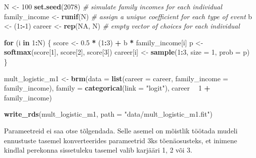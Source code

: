 \documentclass[]{book}
\newenvironment{Shaded}{\begin{snugshade}}{\end{snugshade}}
\newcommand{\KeywordTok}[1]{\textcolor[rgb]{0.13,0.29,0.53}{\textbf{#1}}}
\newcommand{\DataTypeTok}[1]{\textcolor[rgb]{0.13,0.29,0.53}{#1}}
\newcommand{\DecValTok}[1]{\textcolor[rgb]{0.00,0.00,0.81}{#1}}
\newcommand{\FloatTok}[1]{\textcolor[rgb]{0.00,0.00,0.81}{#1}}
\newcommand{\StringTok}[1]{\textcolor[rgb]{0.31,0.60,0.02}{#1}}
\newcommand{\CommentTok}[1]{\textcolor[rgb]{0.56,0.35,0.01}{\textit{#1}}}
\newcommand{\OtherTok}[1]{\textcolor[rgb]{0.56,0.35,0.01}{#1}}
\newcommand{\ControlFlowTok}[1]{\textcolor[rgb]{0.13,0.29,0.53}{\textbf{#1}}}
\newcommand{\OperatorTok}[1]{\textcolor[rgb]{0.81,0.36,0.00}{\textbf{#1}}}
\newcommand{\NormalTok}[1]{#1}
\begin{document}
\begin{Shaded}
\begin{Highlighting}[]
\NormalTok{N <-}\StringTok{ }\DecValTok{100}
\KeywordTok{set.seed}\NormalTok{(}\DecValTok{2078}\NormalTok{)}
\CommentTok{# simulate family incomes for each individual}
\NormalTok{family_income <-}\StringTok{ }\KeywordTok{runif}\NormalTok{(N)}
\CommentTok{# assign a unique coefficient for each type of event}
\NormalTok{b      <-}\StringTok{ }\NormalTok{(}\DecValTok{1}\OperatorTok{:-}\DecValTok{1}\NormalTok{)}
\NormalTok{career <-}\StringTok{ }\KeywordTok{rep}\NormalTok{(}\OtherTok{NA}\NormalTok{, N)  }\CommentTok{# empty vector of choices for each individual}

\ControlFlowTok{for}\NormalTok{ (i }\ControlFlowTok{in} \DecValTok{1}\OperatorTok{:}\NormalTok{N) \{}
\NormalTok{    score     <-}\StringTok{ }\FloatTok{0.5} \OperatorTok{*}\StringTok{ }\NormalTok{(}\DecValTok{1}\OperatorTok{:}\DecValTok{3}\NormalTok{) }\OperatorTok{+}\StringTok{ }\NormalTok{b }\OperatorTok{*}\StringTok{ }\NormalTok{family_income[i]}
\NormalTok{    p         <-}\StringTok{ }\KeywordTok{softmax}\NormalTok{(score[}\DecValTok{1}\NormalTok{], score[}\DecValTok{2}\NormalTok{], score[}\DecValTok{3}\NormalTok{])}
\NormalTok{    career[i] <-}\StringTok{ }\KeywordTok{sample}\NormalTok{(}\DecValTok{1}\OperatorTok{:}\DecValTok{3}\NormalTok{, }\DataTypeTok{size =} \DecValTok{1}\NormalTok{, }\DataTypeTok{prob =}\NormalTok{ p)}
\NormalTok{\}}
\end{Highlighting}
\end{Shaded}

\begin{Shaded}
\begin{Highlighting}[]
\NormalTok{mult_logistic_m1 <-}
\StringTok{  }\KeywordTok{brm}\NormalTok{(}\DataTypeTok{data =} \KeywordTok{list}\NormalTok{(}\DataTypeTok{career =}\NormalTok{ career, }\DataTypeTok{family_income =}\NormalTok{ family_income), }
      \DataTypeTok{family =} \KeywordTok{categorical}\NormalTok{(}\DataTypeTok{link =} \StringTok{"logit"}\NormalTok{),}
\NormalTok{      career }\OperatorTok{~}\StringTok{ }\DecValTok{1} \OperatorTok{+}\StringTok{ }\NormalTok{family_income)}

\KeywordTok{write_rds}\NormalTok{(mult_logistic_m1, }\DataTypeTok{path =} \StringTok{"data/mult_logistic_m1.fit"}\NormalTok{)}
\end{Highlighting}
\end{Shaded}

Parameetreid ei saa otse tõlgendada. Selle asemel on mõistlik töötada
mudeli ennustuste tasemel konverteerides parameetrid 3ks tõenäosusteks,
et inimene kindlal perekonna sissetuleku tasemel valib karjääri 1, 2 või
3.
\end{document}
